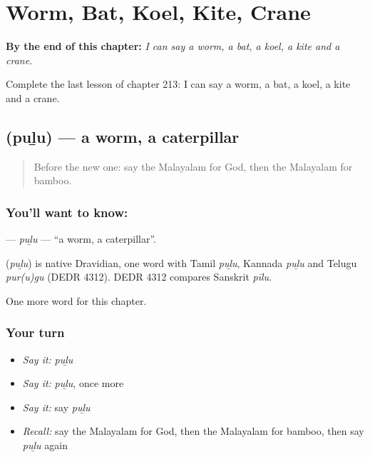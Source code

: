 
\chapter{Worm, Bat, Koel, Kite, Crane}
\label{ch:ml-worm-bat-koel-kite-crane}

\begin{chapteropening}
\textbf{By the end of this chapter:} \emph{I can say a worm, a bat, a koel, a kite and a crane.}

Complete the last lesson of chapter 213: I can say a worm, a bat, a koel, a kite and a crane.
\end{chapteropening}

\section[\texorpdfstring{\ml{പുഴു} (puḻu)}{പുഴു (puḻu)}]{ (puḻu) — a worm, a caterpillar}

\label{lesson:ML-C213-pulu}



\begin{quote}
Before the new one: say the Malayalam for God, then the Malayalam for bamboo.
\end{quote}

\subsection*{You'll want to know: }
\textbf{} — \emph{puḻu} — \textquotedblleft{}a worm, a caterpillar\textquotedblright{}.

\begin{cousinweb}
\textbf{} (\emph{puḻu}) is native Dravidian, one word with Tamil \emph{puḻu}, Kannada \emph{puḻu} and Telugu \emph{pur(u)gu} (DEDR 4312). DEDR 4312 compares Sanskrit \emph{pīlu}.
\end{cousinweb}

\begin{grammarlens}[title={What you've built}]
One more word for this chapter.
\end{grammarlens}

\subsection*{Your turn}
\begin{itemize}
\raggedright
  \item \emph{Say it:} \emph{puḻu}
  \item \emph{Say it:} \emph{puḻu}, once more
  \item \emph{Say it:} say \emph{puḻu}
  \item \emph{Recall:} say the Malayalam for God, then the Malayalam for bamboo, then say \emph{puḻu} again
\end{itemize}

